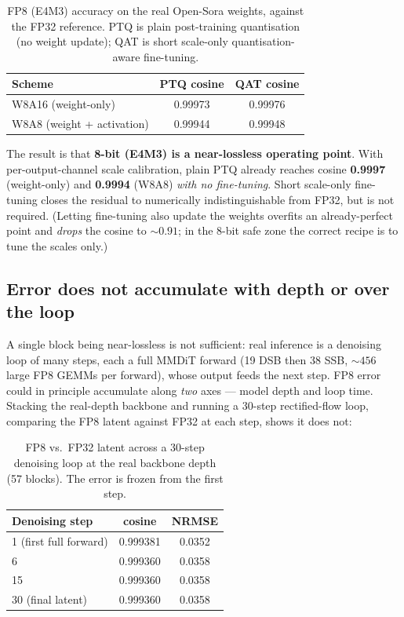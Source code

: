 \documentclass[11pt]{report}
\begin{document}
\begin{table}[h]
\centering
\caption{FP8 (E4M3) accuracy on the real Open-Sora weights, against the
FP32 reference. PTQ is plain post-training quantisation (no weight update);
QAT is short scale-only quantisation-aware fine-tuning.}
\label{tab:fp8-accuracy}
\begin{tabular}{@{}lcc@{}}
\toprule
Scheme & PTQ cosine & QAT cosine \\
\midrule
W8A16 (weight-only) & 0.99973 & 0.99976 \\
W8A8 (weight + activation) & 0.99944 & 0.99948 \\
\bottomrule
\end{tabular}
\end{table}

The result is that \textbf{8-bit (E4M3) is a near-lossless operating point}.
With per-output-channel scale calibration, plain PTQ already reaches cosine
\textbf{0.9997} (weight-only) and \textbf{0.9994} (W8A8) \emph{with no
fine-tuning}. Short scale-only fine-tuning closes the residual to numerically
indistinguishable from FP32, but is not required. (Letting fine-tuning also
update the weights overfits an already-perfect point and \emph{drops} the
cosine to ${\sim}0.91$; in the 8-bit safe zone the correct recipe is to tune
the scales only.)

\subsection{Error does not accumulate with depth or over the loop}

A single block being near-lossless is not sufficient: real inference is a
denoising loop of many steps, each a full MMDiT forward (19 DSB then 38 SSB,
${\sim}456$ large FP8 GEMMs per forward), whose output feeds the next step.
FP8 error could in principle accumulate along \emph{two} axes --- model
depth and loop time. Stacking the real-depth backbone and running a 30-step
rectified-flow loop, comparing the FP8 latent against FP32 at each step,
shows it does not:

\begin{table}[h]
\centering
\caption{FP8 vs.\ FP32 latent across a 30-step denoising loop at the real
backbone depth (57 blocks). The error is frozen from the first step.}
\label{tab:error-prop}
\begin{tabular}{@{}lcc@{}}
\toprule
Denoising step & cosine & NRMSE \\
\midrule
1 (first full forward) & 0.999381 & 0.0352 \\
6 & 0.999360 & 0.0358 \\
15 & 0.999360 & 0.0358 \\
30 (final latent) & 0.999360 & 0.0358 \\
\bottomrule
\end{tabular}
\end{table}
\end{document}
